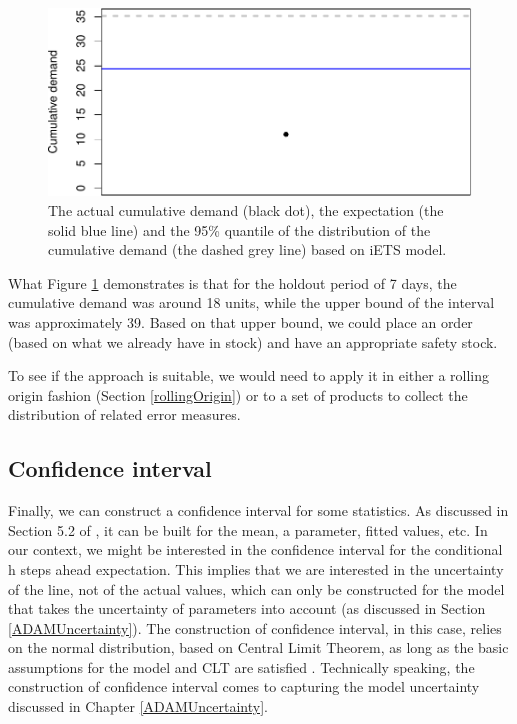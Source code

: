 \documentclass[]{book}
\theoremstyle{definition}
\theoremstyle{definition}
\theoremstyle{definition}
\theoremstyle{definition}
\theoremstyle{remark}
\begin{document}
\begin{figure}
\centering
\includegraphics{Svetunkov--2022----ADAM_files/figure-latex/adamModeliETSCumulative-1.pdf}
\caption{\label{fig:adamModeliETSCumulative}The actual cumulative demand (black dot), the expectation (the solid blue line) and the 95\% quantile of the distribution of the cumulative demand (the dashed grey line) based on iETS model.}
\end{figure}

What Figure \ref{fig:adamModeliETSCumulative} demonstrates is that for the holdout period of 7 days, the cumulative demand was around 18 units, while the upper bound of the interval was approximately 39. Based on that upper bound, we could place an order (based on what we already have in stock) and have an appropriate safety stock.

To see if the approach is suitable, we would need to apply it in either a rolling origin fashion (Section \ref{rollingOrigin}) or to a set of products to collect the distribution of related error measures.

\hypertarget{confidence-interval}{%
\subsection{Confidence interval}\label{confidence-interval}}

Finally, we can construct a confidence interval for some statistics. As discussed in Section 5.2 of \citet{SvetunkovSBA}, it can be built for the mean, a parameter, fitted values, etc. In our context, we might be interested in the confidence interval for the conditional h steps ahead expectation. This implies that we are interested in the uncertainty of the line, not of the actual values, which can only be constructed for the model that takes the uncertainty of parameters into account (as discussed in Section \ref{ADAMUncertainty}). The construction of confidence interval, in this case, relies on the normal distribution, based on Central Limit Theorem, as long as the basic assumptions for the model and CLT are satisfied \citep[see Section 4.2 and Chapter 12 of][]{SvetunkovSBA}. Technically speaking, the construction of confidence interval comes to capturing the model uncertainty discussed in Chapter \ref{ADAMUncertainty}.
\end{document}
